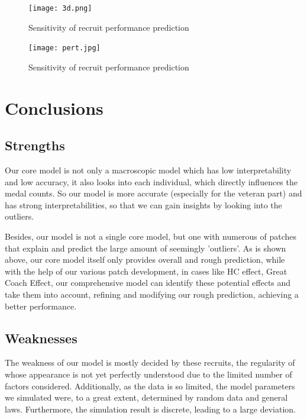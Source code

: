 \documentclass{mcmthesis}
\begin{document}
\begin{figure}[htbp]
    \centering
    \begin{minipage}{0.35\textwidth}
        \centering
        \texttt{[image: 3d.png]}
        \caption{Sensitivity of recruit performance prediction}
        \label{threed}
    \end{minipage}
    \hspace{0.05\textwidth} %
    \begin{minipage}{0.35\textwidth}
        \centering
        \texttt{[image: pert.jpg]}
        \caption{Sensitivity of recruit performance prediction}
        \label{Pert}
    \end{minipage}
\end{figure}



\section{Conclusions}
\subsection{Strengths}

Our core model is not only a macroscopic model which has low interpretability and low accuracy, it also looks into each individual, which directly influences the medal counts. So our model is more accurate (especially for the veteran part) and has strong interpretabilities, so that we can gain insights by looking into the outliers. 

Besides, our model is not a single core model, but one with numerous of patches that explain and predict the large amount of seemingly 'outliers'. As is shown above, our core model itself only provides overall and rough prediction, while with the help of our various patch development, in cases like HC effect, Great Coach Effect, our comprehensive model can identify these potential effects and take them into account, refining and modifying our rough prediction, achieving a better performance.

\subsection{Weaknesses}
The weakness of our model is mostly decided by these recruits, the regularity of whose appearance is not yet perfectly understood due to the limited number of factors considered. Additionally, as the data is so limited, the model parameters we simulated were, to a great extent, determined by random data and general laws. Furthermore, the simulation result is discrete, leading to a large deviation.
\end{document}
